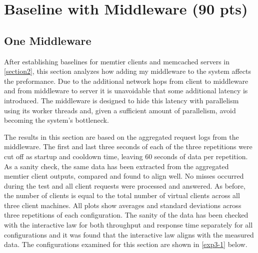 \documentclass[11pt,a4paper]{article}
\begin{document}

\section{Baseline with Middleware (90 pts)}

\subsection{One Middleware} \label{sec3.1}
After establishing baselines for memtier clients and memcached servers in \autoref{section2}, this section analyzes how adding my middleware to the system affects the preformance. Due to the additional network hops from client to middleware and from middleware to server it is unavoidable that some additional latency is introduced. The middleware is designed to hide this latency with parallelism using its worker threads and, given a sufficient amount of parallelism, avoid becoming the system's bottleneck.

The results in this section are based on the aggregated request logs from the middleware. The first and last three seconds of each of the three repetitions were cut off as startup and cooldown time, leaving 60 seconds of data per repetition. As a sanity check, the same data has been extracted from the aggregated memtier client outputs, compared and found to align well. No misses occurred during the test and all client requests were processed and answered. As before, the number of clients is equal to the total number of virtual clients across all three client machines. All plots show averages and standard deviations across three repetitions of each configuration. The sanity of the data has been checked with the interactive law for both throughput and response time separately for all configurations and it was found that the interactive law aligns with the measured data. The configurations examined for this section are shown in \autoref{exp3-1} below.
\end{document}
